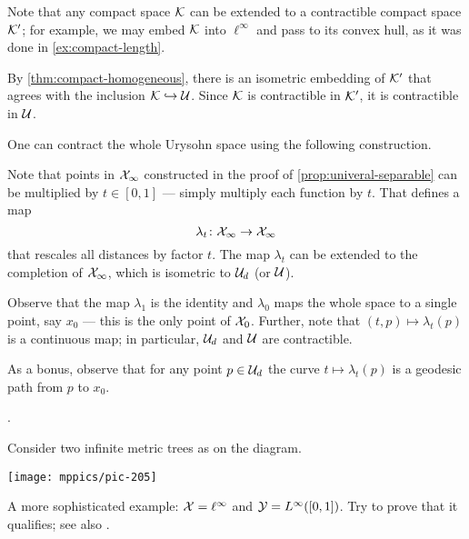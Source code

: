 Note that any compact space $\mathcal{K}$ can be extended to a contractible compact space $\mathcal{K}'$; for example, we may embed $\mathcal{K}$ into $\ell^\infty$ and pass to its convex hull, as it was done in \ref{ex:compact-length}.

By \ref{thm:compact-homogeneous}, there is an isometric embedding of $\mathcal{K}'$ that agrees with the inclusion $\mathcal{K}\hookrightarrow\mathcal{U}$.
Since $\mathcal{K}$ is contractible in $\mathcal{K}'$, it is contractible in $\mathcal{U}$.

One can contract the whole Urysohn space using the following construction.

Note that points in $\mathcal{X}_\infty$ constructed in the proof of \ref{prop:univeral-separable} can be multiplied by $t\in [0,1]$ --- simply multiply each function by $t$.
That defines a map 
\[\lambda_t\colon\mathcal{X}_\infty\to \mathcal{X}_\infty\]
that rescales all distances by factor $t$.
The map $\lambda_t$ can be extended to the completion of $\mathcal{X}_\infty$, which is isometric to $\mathcal{U}_d$ (or $\mathcal{U}$).

Observe that 
the map $\lambda_1$ is the identity  and $\lambda_0$ maps the whole space to a single point, say $x_0$ --- this is the only point of $\mathcal{X}_0$.
Further, note that $(t,p)\mapsto \lambda_t(p)$ is a continuous map; in particular, $\mathcal{U}_d$ and $\mathcal{U}$ are contractible.

As a bonus, observe that for any point $p\in \mathcal{U}_d$ the curve $t\mapsto \lambda_t(p)$ is a geodesic path from $p$ to $x_0$.

 \cite[$\text{(d)}$ on page 82]{gromov-2007}.

Consider two infinite metric trees as on the diagram. 

\begin{Figure}
\vskip-0mm
\centering
\texttt{[image: mppics/pic-205]}
\end{Figure}

A more sophisticated example: $\spc{X}\z=\ell^\infty$ and $\mathcal{Y}=L^\infty([0,1])$.
Try to prove that it qualifies; see also \cite{buehler}.



